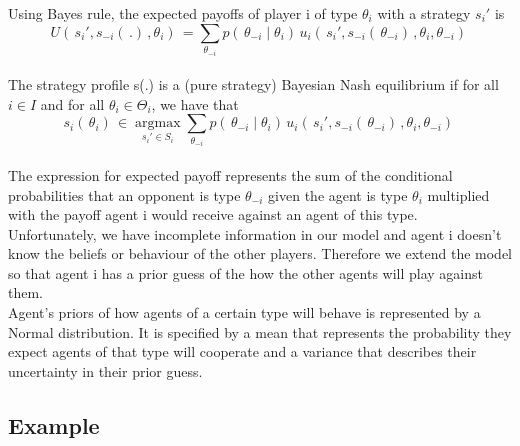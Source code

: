 \documentclass[]{llncs}
\DeclareMathOperator*{\argmax}{argmax}
\begin{document}
Using Bayes rule, the expected payoffs of player i of type $\theta_i$ with a strategy $s_i'$ is 
\[
U(\,s_i', s_{-i}(\, . )\,, \theta_i)\, = \sum\limits_{\theta_{-i}} p(\, \theta_{-i} \mid \theta_i)\, u_i(\,s_i', s_{-i}(\, \theta_{-i} )\,, \theta_i, \theta_{-i})\,
\]
\\
The strategy profile s(.) is a (pure strategy) Bayesian Nash equilibrium if for all $i \in I$ and for all $\theta_i \in \Theta_i$, we have that 
\[
s_i(\,\theta_i)\, \in \argmax\limits_{s_i' \in S_i} \sum\limits_{\theta_{-i}} p(\, \theta_{-i} \mid \theta_i)\, u_i(\,s_i', s_{-i}(\, \theta_{-i} )\,, \theta_i, \theta_{-i})\,
\]
\\
The expression for expected payoff represents the sum of the conditional probabilities that an opponent is type $\theta_{-i}$ given the agent is type $\theta_i$ multiplied with the payoff agent i would receive against an agent of this type.\\
Unfortunately, we have incomplete information in our model and agent i doesn't know the beliefs or behaviour of the other players. Therefore we extend the model so that agent i has a prior guess of the how the other agents will play against them.\\
Agent's priors of how agents of a certain type will behave is represented by a Normal distribution. It is specified by a mean that represents the probability they expect agents of that type will cooperate and a variance that describes their uncertainty in their prior guess. \\

\subsection{Example}
\end{document}
